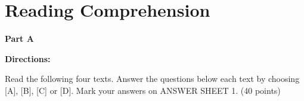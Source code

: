 \section{Reading Comprehension}

\textbf{Part A}

\textbf{Directions:}

Read the following four texts. Answer the questions below each text by choosing [A], [B], [C] or [D]. Mark your answers on ANSWER SHEET 1. (40 points)

\vspace{6pt}